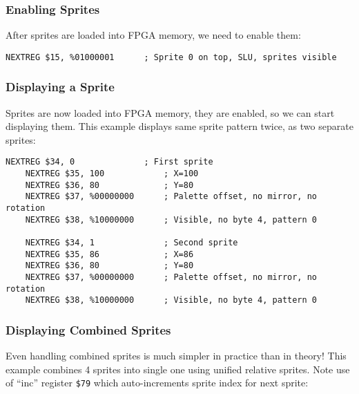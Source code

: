 \documentclass[12pt,twoside,openright,a4paper]{book}
\begin{document}
\subsubsection{Enabling Sprites}

After sprites are loaded into FPGA memory, we need to enable them:

\begin{Verbatim}[gobble=1]
	NEXTREG $15, %01000001		; Sprite 0 on top, SLU, sprites visible
\end{Verbatim}


\subsubsection{Displaying a Sprite}

Sprites are now loaded into FPGA memory, they are enabled, so we can start displaying them. This example displays same sprite pattern twice, as two separate sprites:

\begin{Verbatim}[gobble=1]
	NEXTREG $34, 0              ; First sprite
	NEXTREG $35, 100            ; X=100
	NEXTREG $36, 80             ; Y=80
	NEXTREG $37, %00000000      ; Palette offset, no mirror, no rotation
	NEXTREG $38, %10000000      ; Visible, no byte 4, pattern 0

	NEXTREG $34, 1              ; Second sprite
	NEXTREG $35, 86             ; X=86
	NEXTREG $36, 80             ; Y=80
	NEXTREG $37, %00000000      ; Palette offset, no mirror, no rotation
	NEXTREG $38, %10000000      ; Visible, no byte 4, pattern 0
\end{Verbatim}


\subsubsection{Displaying Combined Sprites}

Even handling combined sprites is much simpler in practice than in theory! This example combines 4 sprites into single one using unified relative sprites. Note use of ``inc'' register {\tt \$79} which auto-increments sprite index for next sprite:
\end{document}

